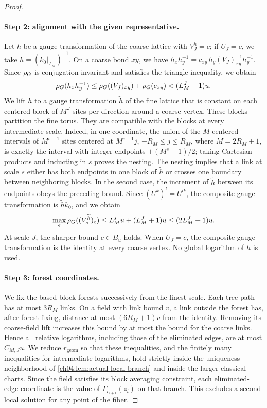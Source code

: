 \begin{proof}
\paragraph{Step 2: alignment with the given representative.}
Let $h$ be a gauge transformation of the coarse lattice with $V_J^h=c$; if $U_J=c$, we take $h=(k_0|_{\Lambda_m})^{-1}$. On a coarse bond $xy$, we have $h_xh_y^{-1}=c_{xy}\,h_y(V_J)_{xy}^{-1}h_y^{-1}$. Since $\rho_G$ is conjugation invariant and satisfies the triangle inequality, we obtain
\[
 \rho_G(h_xh_y^{-1})\le\rho_G((V_J)_{xy})+\rho_G(c_{xy})<(L_M^J+1)u.
\]
We lift $h$ to a gauge transformation $\widetilde h$ of the fine lattice that is constant on each centered block of $M^J$ sites per direction around a coarse vertex. These blocks partition the fine torus. They are compatible with the blocks at every intermediate scale. Indeed, in one coordinate, the union of the $M$ centered intervals of $M^{s-1}$ sites centered at $M^{s-1}j$, $-R_M\le j\le R_M$, where $M=2R_M+1$, is exactly the interval with integer endpoints $\pm(M^s-1)/2$; taking Cartesian products and inducting in $s$ proves the nesting. The nesting implies that a link at scale $s$ either has both endpoints in one block of $\widetilde h$ or crosses one boundary between neighboring blocks. In the second case, the increment of $\widetilde h$ between its endpoints obeys the preceding bound. Since $(U^k)^l=U^{lk}$, the composite gauge transformation is $\widetilde hk_0$, and we obtain
\[
 \max_e\rho_G((V_s^{\widetilde h})_e)\le L_M^su+(L_M^J+1)u\le(2L_M^J+1)u.
\]
At scale $J$, the sharper bound $c\in B_u$ holds. When $U_J=c$, the composite gauge transformation is the identity at every coarse vertex. No global logarithm of $h$ is used.

\paragraph{Step 3: forest coordinates.}
We fix the based block forests successively from the finest scale. Each tree path has at most $3R_M$ links. On a field with link bound $v$, a link outside the forest has, after forest fixing, distance at most $(6R_M+1)v$ from the identity. Removing its coarse-field lift increases this bound by at most the bound for the coarse links. Hence all relative logarithms, including those of the eliminated edges, are at most $C_{M,J}u$. We reduce $r_{\mathrm{geom}}$ so that these inequalities, and the finitely many inequalities for intermediate logarithms, hold strictly inside the uniqueness neighborhood of \cref{ch04:lem:actual-local-branch} and inside the larger classical charts. Since the field satisfies its block averaging constraint, each eliminated-edge coordinate is the value of $\Gamma_{c_{i+1}}(z_i)$ on that branch. This excludes a second local solution for any point of the fiber.


\end{proof}
